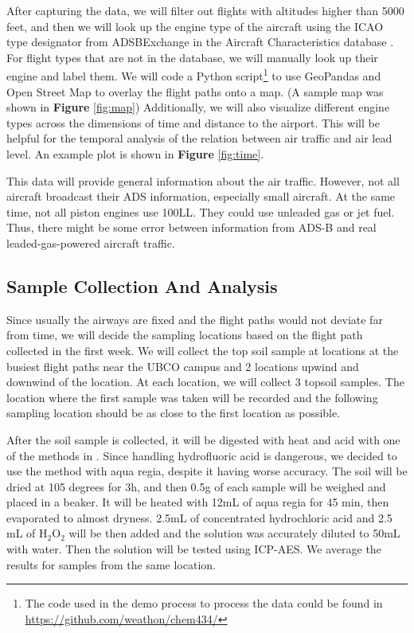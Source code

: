\documentclass[12pt]{article}
\begin{document}
After capturing the data, we will filter out flights with altitudes higher than 5000 feet, and then we will look up the engine type of the aircraft using the ICAO type designator from ADSBExchange in the Aircraft Characteristics database \cite{faa}. For flight types that are not in the database, we will manually look up their engine and label them. We will code a Python script\footnote{The code used in the demo process to process the data could be found in \url{https://github.com/weathon/chem434/}} to use GeoPandas and Open Street Map \cite{OpenStreetMap} to overlay the flight paths onto a map. (A sample map was shown in \textbf{Figure} \ref{fig:map}) Additionally, we will also visualize different engine types across the dimensions of time and distance to the airport. This will be helpful for the temporal analysis of the relation between air traffic and air lead level. An example plot is shown in \textbf{Figure} \ref{fig:time}.


This data will provide general information about the air traffic. However, not all aircraft broadcast their ADS information, especially small aircraft. At the same time, not all piston engines use 100LL. They could use unleaded gas or jet fuel. Thus, there might be some error between information from ADS-B and real leaded-gas-powered aircraft traffic. 

\subsection{Sample Collection And Analysis}
Since usually the airways are fixed and the flight paths would not deviate far from time, we will decide the sampling locations based on the flight path collected in the first week. We will collect the top soil sample at locations at the busiest flight paths near the UBCO campus and 2 locations upwind and downwind of the location. At each location, we will collect 3 topsoil samples. The location where the first sample was taken will be recorded and the following sampling location should be as close to the first location as possible. 

After the soil sample is collected, it will be digested with heat and acid with one of the methods in  \cite{moor_determination_2001}. Since handling hydrofluoric acid is dangerous, we decided to use the method with aqua regia, despite it having worse accuracy. The soil will be dried at 105 degrees for 3h, and then 0.5g of each sample will be weighed and placed in a beaker. It will be heated with 12mL of aqua regia for 45 min, then evaporated to almost dryness. 2.5mL of concentrated hydrochloric acid and 2.5 mL of H$_2$O$_2$ will be then added and the solution was accurately diluted to 50mL with water. \cite{moor_determination_2001} Then the solution will be tested using ICP-AES. We average the results for samples from the same location. 
\end{document}
